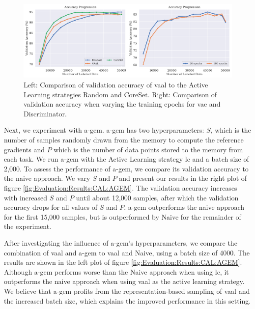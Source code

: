 \begin{figure}[h]
    \centering
    \includegraphics[width=\linewidth]{images/results_CAL/VAAL_plots.png}
    \caption[Continual Active Learning Custom Replay strategy]{Left: Comparison of validation accuracy of \gls{vaal} to the Active Learning strategies Random and CoreSet.
    Right: Comparison of validation accuracy when varying the training epochs for \gls{vae} and Discriminator.}
    \label{fig:Evaluation:Results:CAL:VAAL}
\end{figure}

Next, we experiment with \gls{a-gem}. \gls{a-gem} has two hyperparameters: $S$, which is the number of samples randomly drawn from the memory to compute the reference
gradients and $P$ which is the number of data points stored to the memory from each task. We run \gls{a-gem} with the Active Learning strategy \gls{lc} and a batch size
of 2,000. To assess the performance of \gls{a-gem}, we compare its validation accuracy to the naive approach. We vary $S$ and $P$ and present our results in the right plot
of figure \ref{fig:Evaluation:Results:CAL:AGEM}. The validation accuracy increases with increased $S$ and $P$ until about 12,000 samples, after which the validation 
accuracy drops for all values of $S$ and $P$. \gls{a-gem} outperforms the naive approach for the first 15,000 samples, but is outperformed by Naive for the remainder of
the experiment. \par
After investigating the influence of \gls{a-gem}'s hyperparameters, we compare the combination of \gls{vaal} and \gls{a-gem} to \gls{vaal} and Naive, using a batch size
of 4000. The results are shown in the left plot of figure \ref{fig:Evaluation:Results:CAL:AGEM}. Although \gls{a-gem} performs worse than the Naive
approach when using \gls{lc}, it outperforms the naive approach when using \gls{vaal} as the active learning strategy. We believe that \gls{a-gem} profits from the 
representation-based sampling of \gls{vaal} and the increased batch size, which explains the improved performance in this setting. \par

